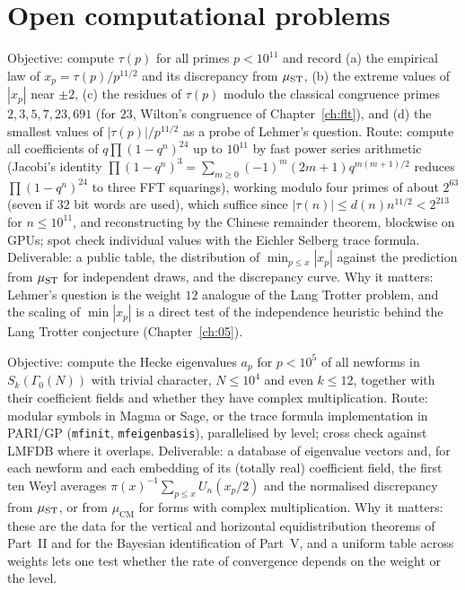 \section{Open computational problems}

\begin{compproblem}
Objective: compute $\tau(p)$ for all primes $p<10^{11}$ and record (a) the empirical law of $x_p=\tau(p)/p^{11/2}$ and its discrepancy from $\mu_{\mathrm{ST}}$, (b) the extreme values of $|x_p|$ near $\pm2$, (c) the residues of $\tau(p)$ modulo the classical congruence primes $2,3,5,7,23,691$ (for $23$, Wilton's congruence of Chapter~\ref{ch:flt}), and (d) the smallest values of $|\tau(p)|/p^{11/2}$ as a probe of Lehmer's question. Route: compute all coefficients of $q\prod(1-q^n)^{24}$ up to $10^{11}$ by fast power series arithmetic (Jacobi's identity $\prod(1-q^n)^3=\sum_{m\ge0}(-1)^m(2m+1)q^{m(m+1)/2}$ reduces $\prod(1-q^n)^{24}$ to three FFT squarings), working modulo four primes of about $2^{63}$ (seven if $32$ bit words are used), which suffice since $|\tau(n)|\le d(n)n^{11/2}<2^{213}$ for $n\le10^{11}$, and reconstructing by the Chinese remainder theorem, blockwise on GPUs; spot check individual values with the Eichler Selberg trace formula. Deliverable: a public table, the distribution of $\min_{p\le x}|x_p|$ against the prediction from $\mu_{\mathrm{ST}}$ for independent draws, and the discrepancy curve. Why it matters: Lehmer's question is the weight $12$ analogue of the Lang Trotter problem, and the scaling of $\min|x_p|$ is a direct test of the independence heuristic behind the Lang Trotter conjecture (Chapter~\ref{ch:05}).
\end{compproblem}

\begin{compproblem}
Objective: compute the Hecke eigenvalues $a_p$ for $p<10^5$ of all newforms in $S_k(\Gamma_0(N))$ with trivial character, $N\le10^4$ and even $k\le12$, together with their coefficient fields and whether they have complex multiplication. Route: modular symbols in Magma or Sage, or the trace formula implementation in PARI/GP (\texttt{mfinit}, \texttt{mfeigenbasis}), parallelised by level; cross check against LMFDB \cite{lmfdb} where it overlaps. Deliverable: a database of eigenvalue vectors and, for each newform and each embedding of its (totally real) coefficient field, the first ten Weyl averages $\pi(x)^{-1}\sum_{p\le x}U_n(x_p/2)$ and the normalised discrepancy from $\mu_{\mathrm{ST}}$, or from $\mu_{\mathrm{CM}}$ for forms with complex multiplication. Why it matters: these are the data for the vertical and horizontal equidistribution theorems of Part~II and for the Bayesian identification of Part~V, and a uniform table across weights lets one test whether the rate of convergence depends on the weight or the level.
\end{compproblem}


